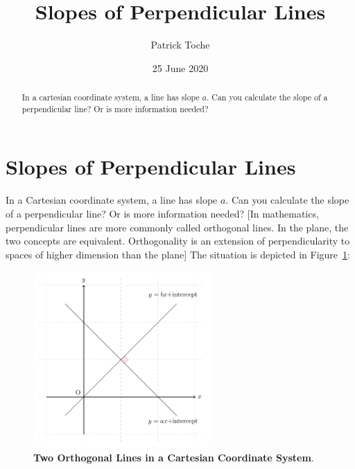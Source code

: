 \documentclass[12pt]{article}
\title{Slopes of Perpendicular Lines}
\author{Patrick Toche}
\date{25 June 2020}
\begin{document}
\begin{minipage}{\textwidth}
\maketitle
\begin{abstract}
In a cartesian coordinate system, a line has slope $a$. Can you calculate the slope of a perpendicular line? Or is more information needed?
\end{abstract}
\end{minipage}

\section*{Slopes of Perpendicular Lines}
In a Cartesian coordinate system, a line has slope $a$. Can you calculate the slope of a perpendicular line? Or is more information needed? [In mathematics, perpendicular lines are more commonly called orthogonal lines. In the plane, the two concepts are equivalent. Orthogonality is an extension of perpendicularity to spaces of higher dimension than the plane] The situation is depicted in Figure~\ref{fig:slopes:01}:
\begin{figure}[hpbt]
\begin{minipage}[b]{\textwidth}
\centering
\includegraphics[width=0.6\textwidth]
{coordinates-and-slopes-1}
\caption{\textbf{Two Orthogonal Lines in a Cartesian Coordinate System}. 
\label{fig:slopes:01}}
\end{minipage}
\end{figure}
\end{document}
